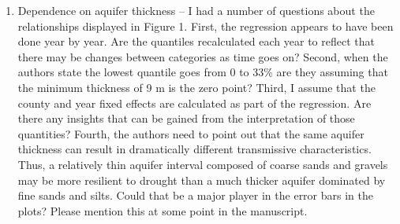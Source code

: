 \documentclass[
]{article}
\providecommand{\tightlist}{%
  \setlength{\itemsep}{0pt}\setlength{\parskip}{0pt}}
\begin{document}
\begin{enumerate}
\def\labelenumi{\arabic{enumi}.}
\setcounter{enumi}{1}
\tightlist
\item
  Dependence on aquifer thickness -- I had a number of questions about
  the relationships displayed in Figure 1. First, the regression appears
  to have been done year by year. Are the quantiles recalculated each
  year to reflect that there may be changes between categories as time
  goes on? Second, when the authors state the lowest quantile goes from
  0 to 33\% are they assuming that the minimum thickness of 9 m is the
  zero point? Third, I assume that the county and year fixed effects are
  calculated as part of the regression. Are there any insights that can
  be gained from the interpretation of those quantities? Fourth, the
  authors need to point out that the same aquifer thickness can result
  in dramatically different transmissive characteristics. Thus, a
  relatively thin aquifer interval composed of coarse sands and gravels
  may be more resilient to drought than a much thicker aquifer dominated
  by fine sands and silts. Could that be a major player in the error
  bars in the plots? Please mention this at some point in the
  manuscript.
\end{enumerate}
\end{document}
